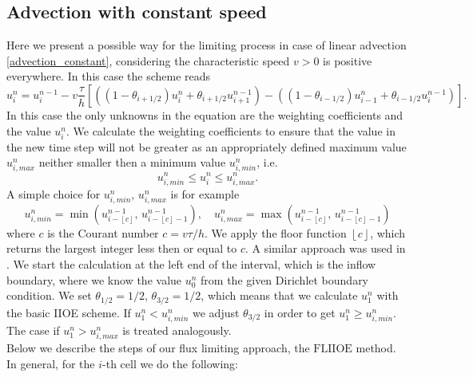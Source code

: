 \documentclass[../include.tex]{subfiles}
\begin{document}
\subsection{Advection with constant speed}
Here we present a possible way for the limiting process in case of linear advection \eqref{advection_constant}, considering the characteristic speed $ v > 0 $ is positive everywhere. In this case the scheme reads
\begin{equation}
	\label{advection_limit}
	u_i^{n} = u_i^{n - 1} - v \frac{\tau}{h} \left[\left((1 - \theta_{i+1/2})u^n_{i} + \theta_{i+1/2}u^{n-1}_{i+1}\right) - \left((1 - \theta_{i-1/2})u^n_{i-1} + \theta_{i-1/2}u^{n-1}_{i}\right)\right].
\end{equation}
In this case the only unknowns in the equation are the weighting coefficients and the value $ u_i^n $. We calculate the weighting coefficients to ensure that the value in the new time step will not be greater as an appropriately defined maximum value $ u_{i,max}^n $ neither smaller then a minimum value $ u_{i,min}^n $, i.e.\
\[
u_{i,min}^n \leq u^n_i \leq u_{i,max}^n.
\]
A simple choice for $ u_{i,min}^n,\, u_{i,max}^n $ is for example
\[
u_{i,min}^n = \min(u_{i-\left \lfloor{c}\right \rfloor}^{n-1},\, u_{i-\left \lfloor{c}\right \rfloor -1}^{n-1}),\quad
u_{i,max}^n = \max(u_{i-\left \lfloor{c}\right \rfloor}^{n-1},\, u_{i-\left \lfloor{c}\right \rfloor-1}^{n-1})
\]
where $ c $ is the Courant number $ c = v \tau/h $. We apply the floor function $ \left \lfloor{c}\right \rfloor $, which returns the largest integer less then or equal to $ c $. A similar approach was used in \cite{iioe2012, iioe2}. We start the calculation at the left end of the interval, which is the inflow boundary, where we know the value $ u_0^n $ from the given Dirichlet boundary condition. We set $ \theta_{1/2} = 1/2,\, \theta_{3/2} = 1/2$, which means that we calculate $ u_1^n $ with the basic IIOE scheme. If $ u_1^n < u_{i,min}^n $ we adjust $ \theta_{3/2} $ in order to get $ u_1^n \geq u_{i,min}^n $. The case if $ u_1^n > u_{i,max}^n $ is treated analogously. \\
Below we describe the steps of our flux limiting approach, the $ \mathrm{FLIIOE} $ method. In general, for the $ i $-th cell we do the following:
\end{document}

